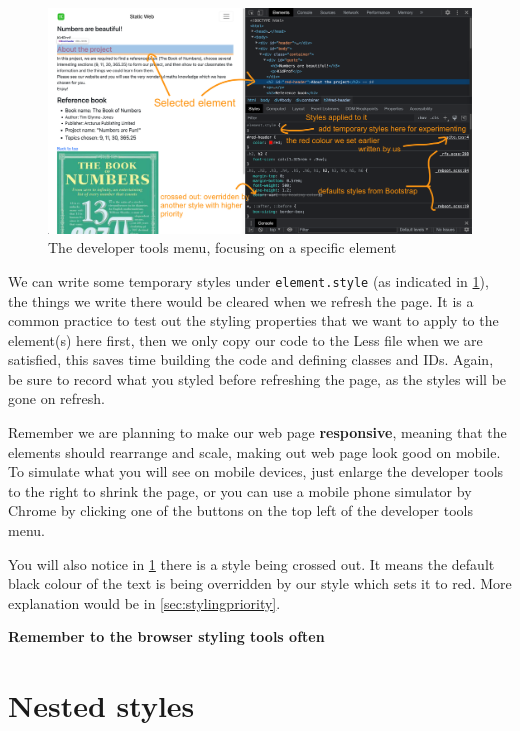 \begin{figure}[h]
\centering
\includegraphics[width=14cm]{images/chn6-devtools2.png}
\caption{The developer tools menu, focusing on a specific element}
\label{fig:devtools2}
\end{figure}

We can write some temporary styles under \texttt{element.style} (as indicated in \cref{fig:devtools2}), the things we write there would be cleared when we refresh the page. It is a common practice to test out the styling properties that we want to apply to the element(s) here first, then we only copy our code to the Less file when we are satisfied, this saves time building the code and defining classes and IDs. Again, be sure to record what you styled before refreshing the page, as the styles will be gone on refresh. 
\vspace{6mm}

Remember we are planning to make our web page \textbf{responsive}, meaning that the elements should rearrange and scale, making out web page look good on mobile. To simulate what you will see on mobile devices, just enlarge the developer tools to the right to shrink the page, or you can use a mobile phone simulator by Chrome by clicking one of the buttons on the top left of the developer tools menu.

You will also notice in \cref{fig:devtools2} there is a style being crossed out. It means the default black colour of the text is being overridden by our style which sets it to red. More explanation would be in \cref{sec:stylingpriority}.
\vspace{6mm}

\begin{center}
\textbf{Remember to the browser styling tools often}
\end{center}

\section{Nested styles}
\label{sec:nestedstyles}

